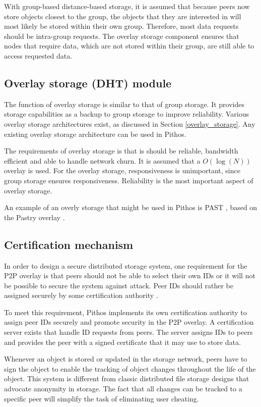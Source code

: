 With group-based distance-based storage, it is assumed that because peers now store objects closest to the group, the objects that they are interested in will most likely be stored within their own group. Therefore, most data requests should be intra-group requests. The overlay storage component ensures that nodes that require data, which are not stored within their group, are still able to access requested data.

\subsection{Overlay storage (DHT) module}

The function of overlay storage is similar to that of group storage. It provides storage capabilities as a backup to group storage to improve reliability. Various overlay storage architectures exist, as discussed in Section \ref{overlay_storage}. Any existing overlay storage architecture can be used in Pithos.

The requirements of overlay storage is that is should be reliable, bandwidth efficient and able to handle network churn. It is assumed that a $O(\log(N))$ overlay is used. For the overlay storage, responsiveness is unimportant, since group storage ensures responsiveness. Reliability is the most important aspect of overlay storage.

An example of an overly storage that might be used in Pithos is PAST \cite{PAST_storage}, based on the Pastry overlay \cite{pastry}.

\subsection{Certification mechanism}

In order to design a secure distributed storage system, one requirement for the P2P overlay is that peers should not be able to select their own IDs or it will not be possible to secure the system against attack. Peer IDs should rather be assigned securely by some certification authority \cite{secure_overlay_routing}.

To meet this requirement, Pithos implements its own certification authority to assign peer IDs securely and promote security in the P2P overlay. A certification server exists that handle ID requests from peers. The server assigns IDs to peers and provides the peer with a signed certificate that it may use to store data.

Whenever an object is stored or updated in the storage network, peers have to sign the object to enable the tracking of object changes throughout the life of the object. This system is different from classic distributed file storage designs that advocate anonymity in storage. The fact that all changes can be tracked to a specific peer will simplify the task of eliminating user cheating.

